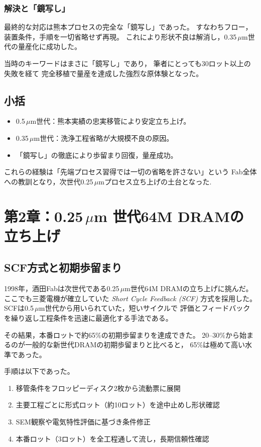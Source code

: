 \documentclass[conference]{IEEEtran}
\begin{document}
\subsubsection{解決と「鏡写し」}
最終的な対応は熊本プロセスの完全な「鏡写し」であった。
すなわちフロー，装置条件，手順を一切省略せず再現。
これにより形状不良は解消し，0.35\,$\mu$m世代の量産化に成功した。

当時のキーワードはまさに「鏡写し」であり，
筆者にとっても30ロット以上の失敗を経て
完全移植で量産を達成した強烈な原体験となった。

\subsection{小括}
\begin{itemize}
  \item 0.5\,$\mu$m世代：熊本実績の忠実移管により安定立ち上げ。
  \item 0.35\,$\mu$m世代：洗浄工程省略が大規模不良の原因。
  \item 「鏡写し」の徹底により歩留まり回復，量産成功。
\end{itemize}

これらの経験は「先端プロセス習得では一切の省略を許さない」という
Fab全体への教訓となり，次世代0.25\,$\mu$mプロセス立ち上げの土台となった.

\section{第2章：0.25\,\texorpdfstring{$\mu$m}{μm} 世代64M DRAMの立ち上げ}

\subsection{SCF方式と初期歩留まり}
1998年，酒田Fabは次世代である0.25\,$\mu$m世代64M DRAMの立ち上げに挑んだ。
ここでも三菱電機が確立していた \emph{Short Cycle Feedback (SCF)} 方式を採用した。
SCFは0.5\,$\mu$m世代から用いられていた，短いサイクルで
評価とフィードバックを繰り返し工程条件を迅速に最適化する手法である。

その結果，本番ロットで約65\%の初期歩留まりを達成できた。
20–30\%から始まるのが一般的な新世代DRAMの初期歩留まりと比べると，
65\%は極めて高い水準であった。

手順は以下であった。
\begin{enumerate}
  \item 移管条件をフロッピーディスク2枚から流動票に展開
  \item 主要工程ごとに形式ロット（約10ロット）を途中止めし形状確認
  \item SEM観察や電気特性評価に基づき条件修正
  \item 本番ロット（3ロット）を全工程通して流し，長期信頼性確認
\end{enumerate}
\end{document}

